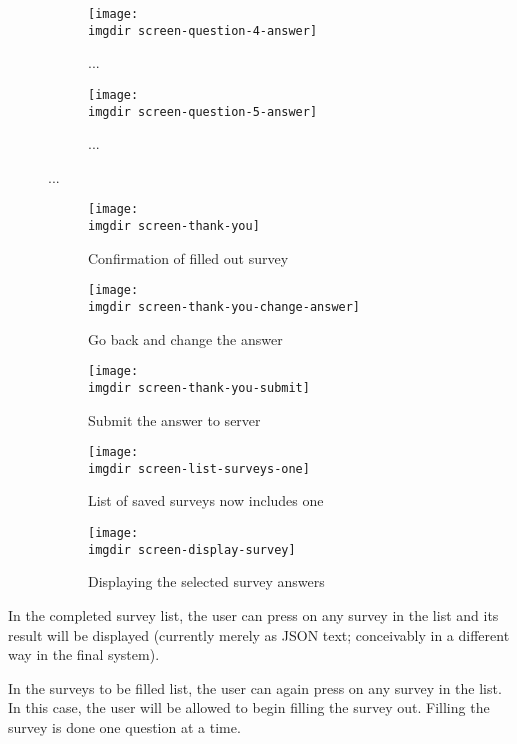 \begin{figure}[!htbp]
 \centering
 \begin{subfigure}{.3\textwidth}
  \centering
  \texttt{[image: \\imgdir screen-question-4-answer]}
  \caption{...}
  \label{fig:sfig1}
\end{subfigure}
\begin{subfigure}{.3\textwidth}
  \centering
  \texttt{[image: \\imgdir screen-question-5-answer]}
  \caption{...}
  \label{fig:sfig2}
\end{subfigure}
 \caption{...}
\end{figure}

\begin{figure}[!htbp]
 \centering
 \begin{subfigure}{.3\textwidth}
  \centering
  \texttt{[image: \\imgdir screen-thank-you]}
  \caption{Confirmation of filled out survey}
  \label{fig:sfig1}
\end{subfigure}
\begin{subfigure}{.3\textwidth}
  \centering
  \texttt{[image: \\imgdir screen-thank-you-change-answer]}
  \caption{Go back and change the answer}
  \label{fig:sfig2}
\end{subfigure}
\begin{subfigure}{.3\textwidth}
  \centering
  \texttt{[image: \\imgdir screen-thank-you-submit]}
  \caption{Submit the answer to server}
  \label{fig:sfig2}
\end{subfigure}
\caption{...}
 \caption{}
\end{figure}

\begin{figure}[!htbp]
 \centering
 \begin{subfigure}{.3\textwidth}
  \centering
  \texttt{[image: \\imgdir screen-list-surveys-one]}
  \caption{List of saved surveys now includes one}
  \label{fig:sfig1}
\end{subfigure}
\begin{subfigure}{.3\textwidth}
  \centering
  \texttt{[image: \\imgdir screen-display-survey]}
  \caption{Displaying the selected survey answers}
  \label{fig:sfig2}
\end{subfigure}
\caption{...}
 \caption{}
\end{figure}

In the completed survey list, the user can press on any survey in the list and its result will be displayed (currently merely as JSON text; conceivably in a different way in the final system).

In the surveys to be filled list, the user can again press on any survey in the list. In this case, the user will be allowed to begin filling the survey out. Filling the survey is done one question at a time.
